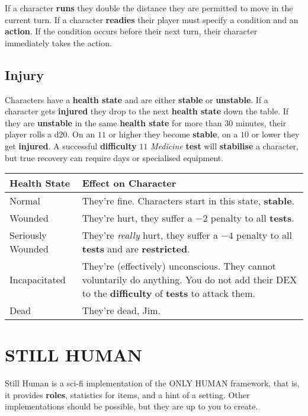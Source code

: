 \documentclass[11pt]{article}
\begin{document}
\begin{multicols}{3}
  If a character \textbf{runs} they double the distance they are permitted to
  move in the current turn. If a character \textbf{readies} their player must
  specify a condition and an \textbf{action}. If the condition occurs before
  their next turn, their character immediately takes the action.

  \subsection*{Injury}

  Characters have a \textbf{health state} and are either \textbf{stable} or
  \textbf{unstable}. If a character gets \textbf{injured} they drop to the next
  \textbf{health state} down the table. If they are \textbf{unstable} in the
  same \textbf{health state} for more than $30$ minutes, their player rolls a
  d20. On an $11$ or higher they become \textbf{stable}, on a $10$ or lower they
  get \textbf{injured}. A successful \textbf{difficulty} $11$ \textit{Medicine}
  \textbf{test} will \textbf{stabilise} a character, but true recovery can
  require days or specialised equipment.

  \begin{tabularx}{\linewidth}{lX}
    Health State & Effect on Character \\
    \hline
    Normal & They're fine. Characters start in this state, \textbf{stable}. \\
    Wounded & They're hurt, they suffer a $-2$ penalty to all \textbf{tests}. \\
    Seriously Wounded & They're \textit{really} hurt, they suffer a $-4$ penalty
      to all \textbf{tests} and are \textbf{restricted}. \\
    Incapacitated & They're (effectively) unconscious. They cannot voluntarily
      do anything. You do not add their DEX to the \textbf{difficulty} of
      \textbf{tests} to attack them. \\
    Dead & They're dead, Jim.
  \end{tabularx}

  \section*{STILL HUMAN}

  Still Human is a sci-fi implementation of the ONLY HUMAN framework, that is,
  it provides \textbf{roles}, statistics for items, and a hint of a setting.
  Other implementations should be possible, but they are up to you to create.


\end{multicols}
\end{document}

